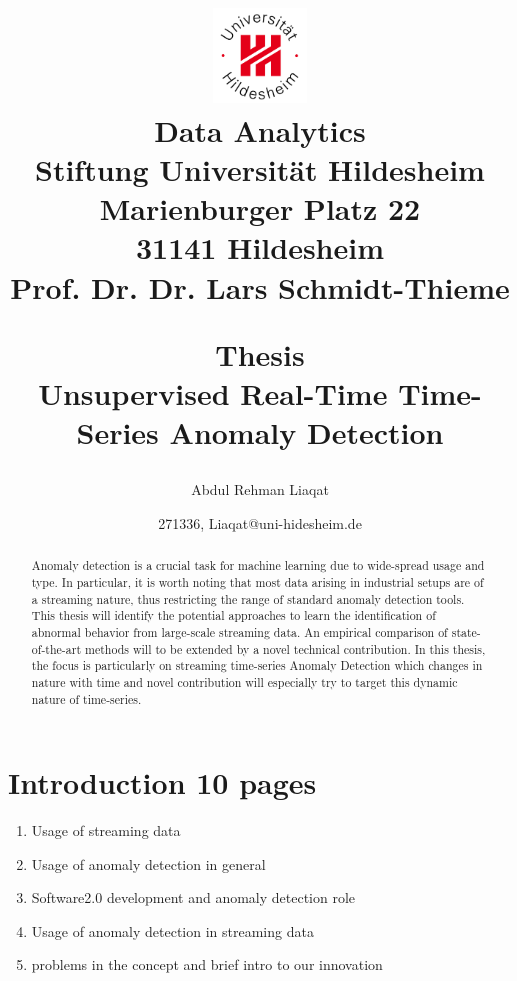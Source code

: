 \documentclass[12pt]{article}
\begin{document}
\title{
\begin{flushright}
\includegraphics[width=2.5cm]{logoUHi.jpg}\\
{\small
Data Analytics\\
Stiftung Universit{\"a}t Hildesheim\\
Marienburger Platz 22\\
31141 Hildesheim\\
Prof. Dr. Dr. Lars Schmidt-Thieme\\
}
\end{flushright}
\bigskip
\begin{center}
Thesis\\
Unsupervised Real-Time Time-Series Anomaly Detection\\
\end{center}
}
\author{Abdul Rehman Liaqat}
\date{271336, Liaqat@uni-hidesheim.de}
\maketitle

\newpage

\begin{abstract}
Anomaly detection is a crucial task for machine learning due to wide-spread usage and type. In particular, it is worth noting that most data arising in industrial setups are of a streaming nature, thus restricting the range of standard anomaly detection tools. This thesis will identify the potential approaches to learn the identification of abnormal behavior from large-scale streaming data. An empirical comparison of state-of-the-art methods will to be extended by a novel technical contribution. In this thesis, the focus is particularly on streaming time-series Anomaly Detection which changes in nature with time and novel contribution will especially try to target this dynamic nature of time-series.
\end{abstract}
\newpage
\tableofcontents
\newpage
\section{Introduction 10 pages}
\begin{enumerate}
	\item Usage of streaming data		
	\item Usage of anomaly detection in general
	\item Software2.0 development and anomaly detection role
	\item Usage of anomaly detection in streaming data
	\item problems in the concept and brief intro to our innovation
\end{enumerate}
\end{document}
